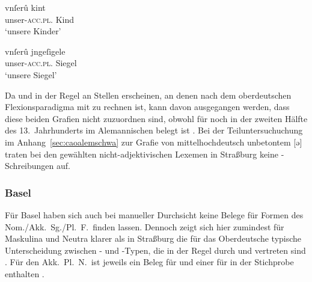 \begin{exe}
\ex \label{ex:adjstrbgu}
	\begin{xlist}

	\ex \label{ex:adjstrbgu_3}
		\gll vnſerû kint \\
			unser-\textsc{acc.pl.\NeutX} Kind \\
		\trans `unsere Kinder'
			\parencites(Nr.~2663, Straßburg, 1297)[62,35]{cao4}

	\ex \label{ex:adjstrbgu_4}
		\gll vnſerû jngeſigele \\
			unser-\textsc{acc.pl.\NeutI} Siegel \\
		\trans `unsere Siegel'
			\parencites(Nr.~2663, Straßburg, 1297)[63,25]{cao4}
	\end{xlist}
\end{exe}

Da  und  in der Regel an Stellen erscheinen, an denen nach dem
oberdeutschen Flexionsparadigma mit  zu
rechnen ist, kann davon ausgegangen werden, dass diese beiden Grafien nicht
 zuzuordnen sind, obwohl  für  noch in der zweiten
Hälfte des 13.~Jahrhunderts im Alemannischen belegt ist
\autocites[41]{paul2007}[305]{ksw2}[vgl.~auch][466--467]{schirmunski1962}. Bei
der Teiluntersuchuchung im Anhang~\ref{sec:caoalemschwa} zur Grafie von
mittelhochdeutsch unbetontem  [ə] traten bei den gewählten
nicht-adjektivischen Lexemen in Straßburg keine -Schreibungen auf.

\subsubsection{Basel}
\label{par:adjbasel}
Für Basel haben sich auch bei manueller Durchsicht keine Belege für Formen des
Nom./Akk.\ Sg./Pl.\ F.\ finden lassen. Dennoch zeigt sich hier zumindest für
Maskulina und Neutra klarer als in Straßburg die für das
Oberdeutsche typische Unterscheidung zwischen - und
-Typen, die in der Regel durch  und  vertreten sind
. Für den Akk.\ Pl.\ N.\ ist jeweils ein Beleg für
 und einer für  in der Stichprobe enthalten
.

